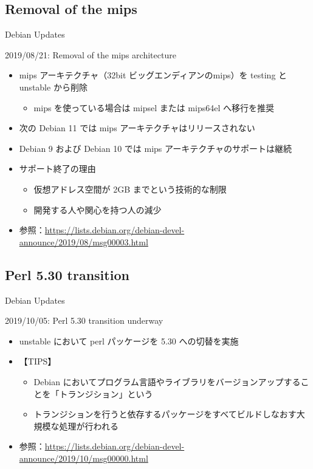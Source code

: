 \documentclass[mingoth,a4paper]{jsarticle}
\begin{document}
\subsection{Removal of the mips}

{Debian Updates}%

2019/08/21: Removal of the mips architecture
  
\begin{itemize}
\item mips アーキテクチャ（32bit ビッグエンディアンのmips）を testing と unstable から削除
  \begin{itemize}
  \item mips を使っている場合は mipsel または mips64el へ移行を推奨 
  \end{itemize}
\item 次の Debian 11 では mips アーキテクチャはリリースされない
\item Debian 9 および Debian 10 では mips アーキテクチャのサポートは継続
\item サポート終了の理由
  \begin{itemize}
  \item 仮想アドレス空間が 2GB までという技術的な制限
  \item 開発する人や関心を持つ人の減少
  \end{itemize}
\item 参照：\url{https://lists.debian.org/debian-devel-announce/2019/08/msg00003.html}
\end{itemize}




\subsection{Perl 5.30 transition}

{Debian Updates}%

2019/10/05: Perl 5.30 transition underway
  
\begin{itemize}
\item unstable において perl パッケージを 5.30 への切替を実施
\item 【TIPS】
  \begin{itemize}
  \item  Debian においてプログラム言語やライブラリをバージョンアップすることを「トランジション」という
  \item トランジションを行うと依存するパッケージをすべてビルドしなおす大規模な処理が行われる
  \end{itemize}
\item 参照：\url{https://lists.debian.org/debian-devel-announce/2019/10/msg00000.html}
\end{itemize}
\end{document}
